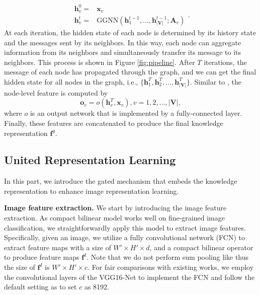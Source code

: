 \documentclass{article}
\begin{document}
\begin{equation}
   \begin{split}
    \mathbf{h}_v^0=&{}\mathbf{x}_v \\
    \mathbf{h}_v^t=&{}\mathrm{GGNN}(\mathbf{h}_1^{t-1},\dots,\mathbf{h}_{|\mathbf{V}|}^{t-1};\mathbf{A}_v)
   \end{split}.
   \label{eq:upate}
\end{equation}
At each iteration, the hidden state of each node is determined by its history state and the messages sent by its neighbors. In this way, each node can aggregate information from its neighbors and simultaneously transfer its message to its neighbors. This process is shown in Figure \ref{fig:pipeline}. After $T$ iterations, the message of each node has propagated through the graph, and we can get the final hidden state for all nodes in the graph, i.e., $\{\mathbf{h}_1^{T},\mathbf{h}_2^{T},\dots,\mathbf{h}_{|\mathbf{V}|}^{T}\}$. Similar to \cite{li2015gated}, the node-level feature is computed by
\begin{equation}
\mathbf{o}_v=o(\mathbf{h}_v^T, \mathbf{x}_v), v=1,2,\dots,|\mathbf{V}|,
\end{equation} 
where $o$ is an output network that is implemented by a fully-connected layer. Finally, these features are concatenated to produce the final knowledge representation $\mathbf{f}^g$. 

\subsection{United Representation Learning}
In this part, we introduce the gated mechanism that embeds the knowledge representation to enhance image representation learning.


\noindent\textbf{Image feature extraction. }We start by introducing the image feature extraction. As compact bilinear model \cite{gao2016compact} works well on fine-grained image classification, we straightforwardly apply this model to extract image features. Specifically, given an image, we utilize a fully convolutional network (FCN) to extract feature maps with a size of $W'\times H' \times d$, and a compact bilinear operator to produce feature maps $\textbf{f}^I$. Note that we do not perform sum pooling like \cite{gao2016compact} thus the size of $\textbf{f}^I$ is $W'\times H' \times c$. For fair comparisons with existing works, we employ the convolutional layers of the VGG16-Net to implement the FCN and follow the default setting as \cite{gao2016compact} to set $c$ as 8192.
\end{document}
